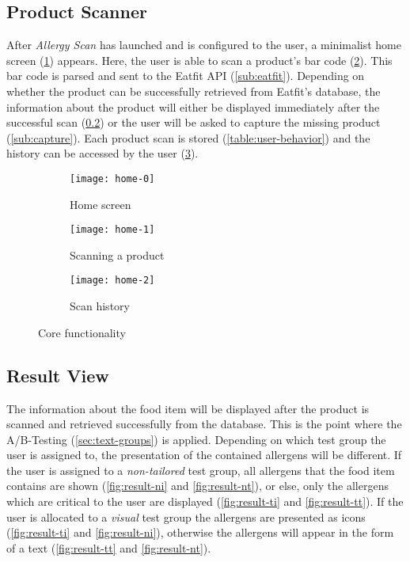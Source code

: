 \subsection{Product Scanner}

After \emph{Allergy Scan} has launched and is configured to the user, a minimalist home screen (\cref{fig:home-0}) appears. Here, the user is able to scan a product's bar code (\cref{fig:home-1}). This bar code is parsed and sent to the Eatfit API (\cref{sub:eatfit}). Depending on whether the product can be successfully retrieved from Eatfit's database, the information about the product will either be displayed immediately after the successful scan (\cref{sub:result}) or the user will be asked to capture the missing product (\cref{sub:capture}). Each product scan is stored (\cref{table:user-behavior}) and the history can be accessed by the user (\cref{fig:home-2}).

\begin{figure}[H]
     \centering
     
     \begin{subfigure}[b]{0.28\textwidth}
         \centering
         \texttt{[image: home-0]}
         \caption{Home screen}
         \label{fig:home-0}
     \end{subfigure}
          \hfill
     \begin{subfigure}[b]{0.28\textwidth}
         \centering
         \texttt{[image: home-1]}
         \caption{Scanning a product}
         \label{fig:home-1}
     \end{subfigure}
          \hfill
     \begin{subfigure}[b]{0.28\textwidth}
         \centering
         \texttt{[image: home-2]}
         \caption{Scan history}
         \label{fig:home-2}
     \end{subfigure}
        \caption{Core functionality}
        \label{fig:home}
\end{figure}

\subsection{Result View}
\label{sub:result}

The information about the food item will be displayed after the product is scanned and retrieved successfully from the database. This is the point where the A/B-Testing (\cref{sec:text-groups}) is applied. Depending on which test group the user is assigned to, the presentation of the contained allergens will be different. If the user is assigned to a \emph{non-tailored} test group, all allergens that the food item contains are shown (\cref{fig:result-ni} and \cref{fig:result-nt}), or else, only the allergens which are critical to the user are displayed (\cref{fig:result-ti} and \cref{fig:result-tt}). If the user is allocated to a \emph{visual} test group the allergens are presented as icons (\cref{fig:result-ti} and \cref{fig:result-ni}), otherwise the allergens will appear in the form of a text (\cref{fig:result-tt} and \cref{fig:result-nt}).

